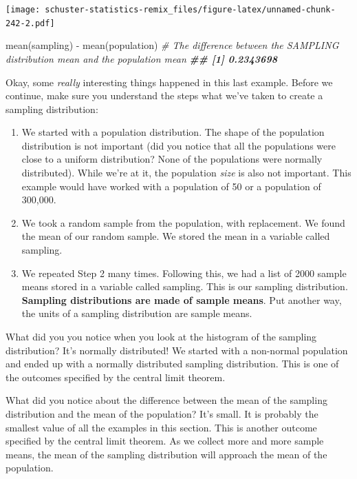 \documentclass[
]{book}
\newenvironment{Shaded}{\begin{snugshade}}{\end{snugshade}}
\newcommand{\CommentTok}[1]{\textcolor[rgb]{0.56,0.35,0.01}{\textit{#1}}}
\newcommand{\DocumentationTok}[1]{\textcolor[rgb]{0.56,0.35,0.01}{\textbf{\textit{#1}}}}
\newcommand{\FunctionTok}[1]{\textcolor[rgb]{0.00,0.00,0.00}{#1}}
\newcommand{\NormalTok}[1]{#1}
\newcommand{\SpecialCharTok}[1]{\textcolor[rgb]{0.00,0.00,0.00}{#1}}
\providecommand{\tightlist}{%
  \setlength{\itemsep}{0pt}\setlength{\parskip}{0pt}}
\begin{document}
\texttt{[image: schuster-statistics-remix\_files/figure-latex/unnamed-chunk-242-2.pdf]}

\begin{Shaded}
\begin{Highlighting}[]
\FunctionTok{mean}\NormalTok{(sampling) }\SpecialCharTok{{-}} \FunctionTok{mean}\NormalTok{(population) }\CommentTok{\# The difference between the SAMPLING distribution mean and the population mean}
\DocumentationTok{\#\# [1] 0.2343698}
\end{Highlighting}
\end{Shaded}

Okay, some \emph{really} interesting things happened in this last example. Before we continue, make sure you understand the steps what we've taken to create a sampling distribution:

\begin{enumerate}
\def\labelenumi{\arabic{enumi}.}
\tightlist
\item
  We started with a population distribution. The shape of the population distribution is not important (did you notice that all the populations were close to a uniform distribution? None of the populations were normally distributed). While we're at it, the population \emph{size} is also not important. This example would have worked with a population of 50 or a population of 300,000.
\item
  We took a random sample from the population, with replacement. We found the mean of our random sample. We stored the mean in a variable called sampling.
\item
  We repeated Step 2 many times. Following this, we had a list of 2000 sample means stored in a variable called sampling. This is our sampling distribution. \textbf{Sampling distributions are made of sample means}. Put another way, the units of a sampling distribution are sample means.
\end{enumerate}

What did you you notice when you look at the histogram of the sampling distribution? It's normally distributed! We started with a non-normal population and ended up with a normally distributed sampling distribution. This is one of the outcomes specified by the central limit theorem.

What did you notice about the difference between the mean of the sampling distribution and the mean of the population? It's small. It is probably the smallest value of all the examples in this section. This is another outcome specified by the central limit theorem. As we collect more and more sample means, the mean of the sampling distribution will approach the mean of the population.
\end{document}
